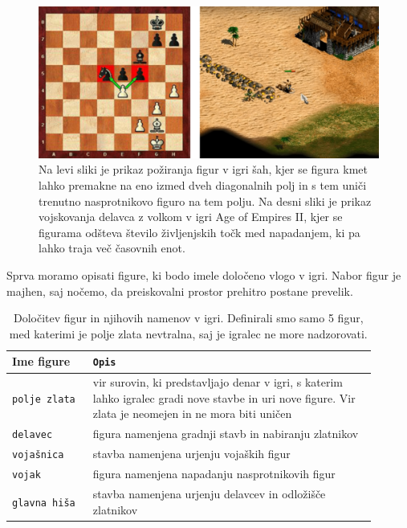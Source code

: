 \documentclass[a4paper, 12pt]{book}
\begin{document}
\begin{figure}[h!]
	\begin{center}
		\includegraphics[width=1\textwidth]{photos/horizontal_health.pdf}
	\end{center}
	\caption{Na levi sliki je prikaz požiranja figur v igri šah, kjer se figura kmet lahko premakne na eno izmed dveh diagonalnih polj in s tem uniči trenutno nasprotnikovo figuro na tem polju. 
		Na desni sliki je prikaz vojskovanja delavca z volkom v igri Age of Empires II, kjer se figurama odšteva število življenjskih točk med napadanjem, ki pa lahko traja več časovnih enot. }
	\label{picPoziranjeFigur}
\end{figure}
\noindent
Sprva moramo opisati figure, ki bodo imele določeno vlogo v igri. 
Nabor figur je majhen, saj nočemo, da preiskovalni prostor prehitro postane prevelik.

\begin{table}
	\begin{center}
		\begin{tabular}{p{0.2\linewidth}|p{0.7\linewidth}}
			Ime figure        & {\tt Opis} \\ \hline
			{\tt polje zlata} & vir surovin, ki predstavljajo denar v igri, s katerim lahko igralec gradi nove stavbe in uri nove figure. 
								Vir zlata je neomejen in ne mora biti uničen \\
			{\tt delavec}     & figura namenjena gradnji stavb in nabiranju zlatnikov \\
			{\tt vojašnica}   & stavba namenjena urjenju vojaških figur \\
			{\tt vojak}       & figura namenjena napadanju nasprotnikovih figur \\
			{\tt glavna hiša} & stavba namenjena urjenju delavcev in odložišče zlatnikov \\
		\end{tabular}
	\end{center}
	\caption{Določitev figur in njihovih namenov v igri. Definirali smo samo 5 figur, med katerimi je polje zlata nevtralna, saj je igralec ne more nadzorovati. }
	\label{tableFiguresDescription}
\end{table}
\end{document}
